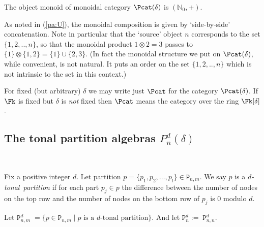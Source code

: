 \documentclass[reqno,10pt,a4paper]{amsart}
\newcommand{\N}{\mathbb{N}}
\newcommand{\red}[1]{\textcolor{red}{#1}}
\newcommand{\ppm}[1]{\red{#1}}
\newcommand{\nk}{n}  %
\newcommand{\dl}{d}  %
\newcommand{\dell}{\dl}  %
\newcommand{\ignore}[1]{}
\newcommand{\rmP}{{\mathtt P}} %
\begin{document}





\mdef  \label{de:Pcat}
The object monoid of monoidal category 
$\Pcat(\delta)$   %
is $(\N_0, +)$. 
%
\ignore{ 
For $i,j \in \N_0$ we write $\Pcat_{ij}$ for the set of set partitions of 
the set $\ul{i}\cup\ul{j}'$,
where $\ul{n}=\{1,2,..,n\}$ and $\ul{n}' = \{1',2',..,n'\}$.
}
%
As noted in (\ref{pa:U}), 
the monoidal composition is given by `side-by-side' concatenation. 
%
Note in particular that
the `source' object $n$ corresponds to the set $\{1,2,..,n\}$,
so that 
the monoidal product 
$1\otimes 2 = 3$ passes to $\{1\} \otimes \{1,2\} = \{1\}\cup\{2,3\}$. 
(In fact the monoidal structure we put on 
$\Pcat(\delta)$, 
while convenient, 
is not natural. It puts an order on the set $\{1,2,..,n\}$ which is not intrinsic to the set in this context.)

For fixed (but arbitrary) 
$\delta$  %
we may write just $\Pcat$ for 
the category 
$\Pcat(\delta)$. 
If 
$\Fk$ is fixed but 
$\delta$  %
is  {\em not} 
fixed then $\Pcat$ means the category over the ring $\Fk[\delta]$.







\subsection{The tonal partition algebras $P_\nk^\dell(\delta)$} 
\label{ss:constructPd}
$\;$ 

\newcommand{\tone}{tonal}  %

\mdef 
Fix a positive integer $\dell$. 
Let partition $p = \{p_1, p_2, \ldots, p_l \} \in \rmP_{n,m}$.
We say $p$ is a  \emph{$\dell$-\tone\ partition} if for each 
part $p_j\in p$ the 
difference between the number of nodes on the top row and the number of nodes on the bottom row of $p_j$ is $0$ modulo $\dell$. 

Let 
$\rmP_{\nk,m}^\dell \; = 
\{p\in \rmP_{n,m} \mid p\text{ is a }\dell\text{-\tone\ partition}\}$.
And let $\rmP_{n}^\dell := \; \rmP_{n,n}^\dell$. 
\end{document}
